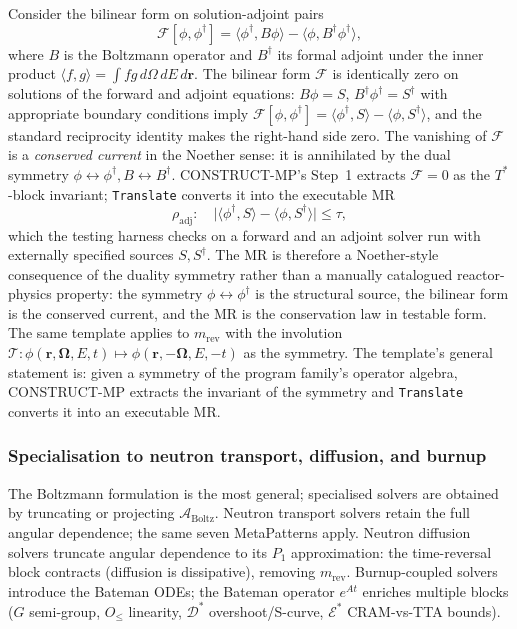 \documentclass[acmsmall, screen]{acmart}
\begin{document}
Consider the bilinear form on solution-adjoint pairs
\begin{equation}
\label{eq:bilinear-boltz}
\mathcal{F}[\phi, \phi^{\dagger}] = \langle \phi^{\dagger}, B\phi \rangle - \langle \phi, B^{\dagger}\phi^{\dagger} \rangle,
\end{equation}
where $B$ is the Boltzmann operator and $B^{\dagger}$ its formal adjoint under the inner product $\langle f, g \rangle = \int f g \,d\Omega\,dE\,d\mathbf{r}$. The bilinear form $\mathcal{F}$ is identically zero on solutions of the forward and adjoint equations: $B\phi = S$, $B^{\dagger}\phi^{\dagger} = S^{\dagger}$ with appropriate boundary conditions imply $\mathcal{F}[\phi, \phi^{\dagger}] = \langle \phi^{\dagger}, S \rangle - \langle \phi, S^{\dagger} \rangle$, and the standard reciprocity identity makes the right-hand side zero. The vanishing of $\mathcal{F}$ is a \emph{conserved current} in the Noether sense: it is annihilated by the dual symmetry $\phi \leftrightarrow \phi^{\dagger}, B \leftrightarrow B^{\dagger}$. CONSTRUCT-MP's Step~1 extracts $\mathcal{F} = 0$ as the $T^{*}$-block invariant; \texttt{Translate} converts it into the executable MR
\begin{equation}
\label{eq:m-adj-mr}
\rho_{\mathrm{adj}}: \quad \big| \langle \phi^{\dagger}, S \rangle - \langle \phi, S^{\dagger} \rangle \big| \le \tau,
\end{equation}
which the testing harness checks on a forward and an adjoint solver run with externally specified sources $S, S^{\dagger}$. The MR is therefore a Noether-style consequence of the duality symmetry rather than a manually catalogued reactor-physics property: the symmetry $\phi \leftrightarrow \phi^{\dagger}$ is the structural source, the bilinear form is the conserved current, and the MR is the conservation law in testable form. The same template applies to $m_{\mathrm{rev}}$ with the involution $\mathcal{T}: \phi(\mathbf{r}, \boldsymbol{\Omega}, E, t) \mapsto \phi(\mathbf{r}, -\boldsymbol{\Omega}, E, -t)$ as the symmetry. The template's general statement is: given a symmetry of the program family's operator algebra, CONSTRUCT-MP extracts the invariant of the symmetry and \texttt{Translate} converts it into an executable MR.

\subsubsection{Specialisation to neutron transport, diffusion, and burnup}

The Boltzmann formulation is the most general; specialised solvers are obtained by truncating or projecting $\mathcal{A}_{\mathrm{Boltz}}$. Neutron transport solvers retain the full angular dependence; the same seven MetaPatterns apply. Neutron diffusion solvers truncate angular dependence to its $P_1$ approximation: the time-reversal block contracts (diffusion is dissipative), removing $m_{\mathrm{rev}}$. Burnup-coupled solvers introduce the Bateman ODEs; the Bateman operator $e^{At}$ enriches multiple blocks ($G$ semi-group, $O_{\le}$ linearity, $\mathcal{D}^{*}$ overshoot/S-curve, $\mathcal{E}^{*}$ CRAM-vs-TTA bounds).
\end{document}
